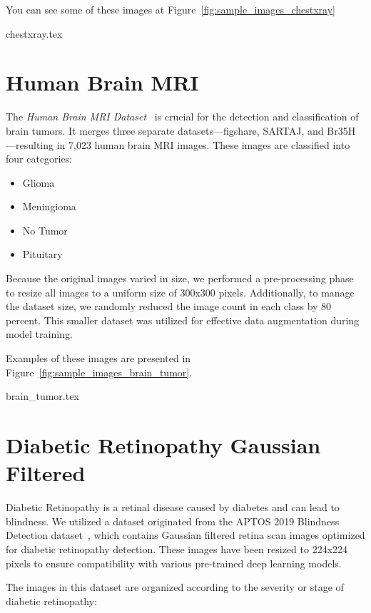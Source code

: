 You can see some of these images at Figure~\ref{fig:sample_images_chestxray}

{chestxray.tex}

\section{Human Brain MRI}

The \textit{Human Brain MRI Dataset}~\cite{brain_mri_dataset} is crucial for the detection and classification of brain tumors. It merges three separate datasets—figshare, SARTAJ, and Br35H—resulting in 7,023 human brain MRI images. These images are classified into four categories:

\begin{itemize}
  \item Glioma
  \item Meningioma
  \item No Tumor
  \item Pituitary
\end{itemize}

Because the original images varied in size, we performed a pre-processing phase to resize all images to a uniform size of 300x300 pixels. Additionally, to manage the dataset size, we randomly reduced the image count in each class by 80 percent. This smaller dataset was utilized for effective data augmentation during model training. 

Examples of these images are presented in Figure~\ref{fig:sample_images_brain_tumor}.

{brain_tumor.tex}

\section{Diabetic Retinopathy Gaussian Filtered}

Diabetic Retinopathy is a retinal disease caused by diabetes and can lead to blindness. We utilized a dataset originated from the APTOS 2019 Blindness Detection dataset~\cite{diabetic_retinopathy_dataset}, which contains Gaussian filtered retina scan images optimized for diabetic retinopathy detection. These images have been resized to 224x224 pixels to ensure compatibility with various pre-trained deep learning models.

The images in this dataset are organized according to the severity or stage of diabetic retinopathy:

